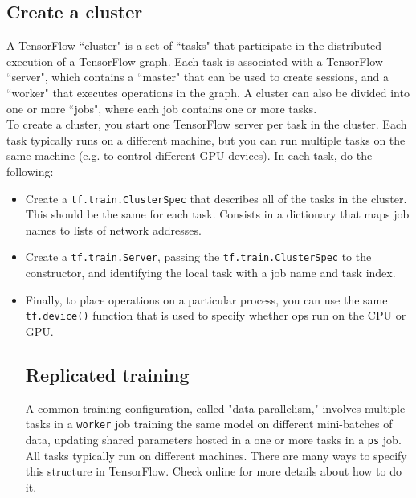 \documentclass[11pt,a4paper]{article}
\begin{document}
\subsection{Create a cluster}  
  A TensorFlow ``cluster" is a set of ``tasks" that participate in the distributed execution of a TensorFlow graph. Each task is associated with a TensorFlow ``server", which contains a ``master" that can be used to create sessions, and a ``worker" that executes operations in the graph. A cluster can also be divided into one or more ``jobs", where each job contains one or more tasks. \\
  To create a cluster, you start one TensorFlow server per task in the cluster. Each task typically runs on a different machine, but you can run multiple tasks on the same machine (e.g. to control different GPU devices). In each task, do the following:
\begin{itemize}
	\item Create a \texttt{tf.train.ClusterSpec} that describes all of the tasks in the cluster. This should be the same for each task. Consists in a dictionary that maps job names to lists of network addresses. 
	\item Create a \texttt{tf.train.Server}, passing the \texttt{tf.train.ClusterSpec} to the constructor, and identifying the local task with a job name and task index.
	\item Finally, to place operations on a particular process, you can use the same \texttt{tf.device()} function that is used to specify whether ops run on the CPU or GPU. 

\subsection{Replicated training}
A common training configuration, called "data parallelism," involves multiple tasks in a \texttt{worker} job training the same model on different mini-batches of data, updating shared parameters hosted in a one or more tasks in a \texttt{ps} job. All tasks typically run on different machines. There are many ways to specify this structure in TensorFlow. Check online for more details about how to do it. 
\end{itemize}
\end{document}
